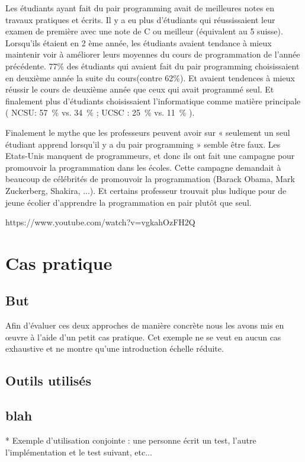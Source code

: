 \documentclass[journal, a4paper, frenchb]{IEEEtran}
\begin{document}
Les étudiants ayant fait du pair programming avait de meilleures notes en travaux pratiques et écrits.
Il y a eu plus d’étudiants qui réussissaient leur examen de première avec une note de C ou meilleur
(équivalent au 5 suisse). Lorsqu’ils étaient en 2 ème année, les étudiants avaient tendance à mieux
maintenir voir à améliorer leurs moyennes du cours de programmation de l’année précédente. 77\%
des étudiants qui avaient fait du pair programming choisissaient en deuxième année la suite du cours(contre 62\%). Et avaient tendences à mieux réussir le cours de deuxième année que ceux qui avait
programmé seul. Et finalement plus d’étudiants choisissaient l’informatique comme matière
principale ( NCSU: 57~\% vs. 34~\% ; UCSC : 25~\% vs. 11~\% ).

Finalement le mythe que les professeurs peuvent avoir sur « seulement un seul étudiant apprend
lorsqu’il y a du pair programming » semble être faux. Les Etats-Unis manquent de programmeurs, et
donc ils ont fait une campagne pour promouvoir la programmation dans les écoles. Cette campagne
demandait à beaucoup de célébrités de promouvoir la programmation (Barack Obama, Mark
Zuckerberg, Shakira, ...). Et certains professeur trouvait plus ludique pour de jeune écolier
d’apprendre la programmation en pair plutôt que seul.

https://www.youtube.com/watch?v=vgkahOzFH2Q

\section{Cas pratique}

\subsection{But}

Afin d'évaluer ces deux approches de manière concrète nous les avons mis en œuvre à l'aide d'un petit cas pratique. Cet exemple ne se veut en aucun cas exhaustive et ne montre qu'une introduction échelle réduite.


\subsection{Outils utilisés}

\subsection{blah}

* Exemple d'utilisation conjointe : une personne écrit un test, l'autre l'implémentation et le test suivant, etc...
\end{document}
